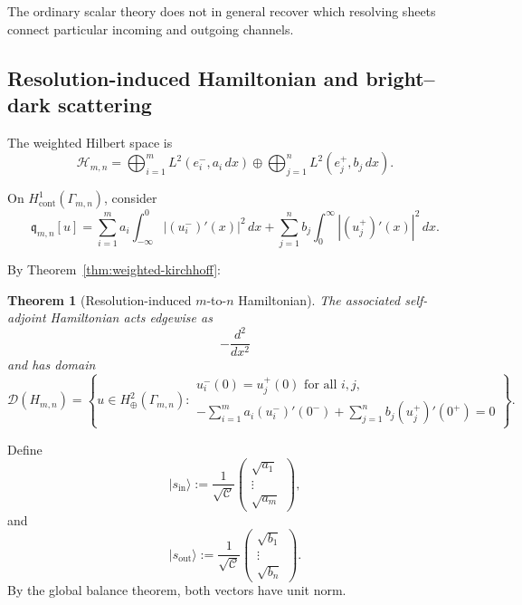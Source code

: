 \documentclass[11pt]{article}
\theoremstyle{plain}
\newtheorem{theorem}{Theorem}[section]
\theoremstyle{definition}
\begin{document}
The ordinary scalar theory does not in general recover which resolving
sheets connect particular incoming and outgoing channels.

\subsection{Resolution-induced Hamiltonian and bright--dark scattering}
\label{subsec:Bmn-Hamiltonian}
\label{subsec:Bmn-S-matrix}
\label{subsec:Bmn-bright-dark}
\label{subsec:Bmn-individual-scattering}
\label{subsec:Bmn-complete-example}

The weighted Hilbert space is
\[
  \mathcal H_{m,n}
  =
  \bigoplus_{i=1}^{m}
  L^2(e_i^-,a_i\,dx)
  \oplus
  \bigoplus_{j=1}^{n}
  L^2(e_j^+,b_j\,dx).
\]

On
\(H^1_{\mathrm{cont}}(\Gamma_{m,n})\),
consider
\[
  \mathfrak q_{m,n}[u]
  =
  \sum_{i=1}^{m}
  a_i
  \int_{-\infty}^{0}
  |(u_i^-)'(x)|^2\,dx
  +
  \sum_{j=1}^{n}
  b_j
  \int_0^\infty
  |(u_j^+)'(x)|^2\,dx.
\]

By Theorem~\ref{thm:weighted-kirchhoff}:

\begin{theorem}[Resolution-induced \(m\)-to-\(n\) Hamiltonian]
\label{thm:Bmn-Hamiltonian}
The associated self-adjoint Hamiltonian acts edgewise as
\[
  -\frac{d^2}{dx^2}
\]
and has domain
\[
  \mathcal D(H_{m,n})
  =
  \left\{
    u\in H^2_\oplus(\Gamma_{m,n}):
    \begin{array}{l}
      u_i^-(0)=u_j^+(0)
      \text{ for all }i,j,\\[2mm]
      \displaystyle
      -\sum_{i=1}^{m}
      a_i(u_i^-)'(0^-)
      +
      \sum_{j=1}^{n}
      b_j(u_j^+)'(0^+)
      =
      0
    \end{array}
  \right\}.
\]
\end{theorem}

Define
\[
  |s_{\mathrm{in}}\rangle
  :=
  \frac{1}{\sqrt{\mathcal C}}
  \begin{pmatrix}
    \sqrt{a_1}\\
    \vdots\\
    \sqrt{a_m}
  \end{pmatrix},
\]
and
\[
  |s_{\mathrm{out}}\rangle
  :=
  \frac{1}{\sqrt{\mathcal C}}
  \begin{pmatrix}
    \sqrt{b_1}\\
    \vdots\\
    \sqrt{b_n}
  \end{pmatrix}.
\]
By the global balance theorem, both vectors have unit norm.
\end{document}
